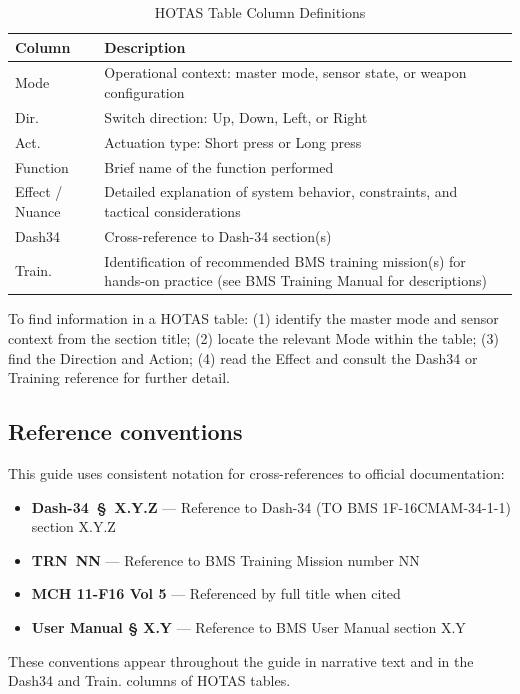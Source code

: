 \documentclass[11pt, a4paper, twoside]{report}
\newcommand{\dashref}[1]{Dash-34~\S~#1}
\newcommand{\trnref}[1]{TRN~#1}
\begin{document}
\begin{table}[H]
	\centering
	\caption{HOTAS Table Column Definitions}
	\label{tab:C1-hotastable-format}
	\small
	\renewcommand{\arraystretch}{1.25}
	\begin{tabular}{L{2.2cm} L{11.5cm}}
		\toprule
		\textbf{Column} & \textbf{Description} \\
		\midrule
		Mode & Operational context: master mode, sensor state, or weapon configuration \\
		Dir. & Switch direction: Up, Down, Left, or Right \\
		Act. & Actuation type: Short press or Long press \\
		Function & Brief name of the function performed \\
		Effect / Nuance & Detailed explanation of system behavior, constraints, and tactical considerations \\
		Dash34 & Cross-reference to Dash-34 section(s) \\
		Train. & Identification of recommended BMS training mission(s) for hands-on practice (see BMS Training Manual for descriptions) \\
		\bottomrule
	\end{tabular}
\end{table}

To find information in a HOTAS table: (1) identify the master mode and sensor context from the section title; (2) locate the relevant Mode within the table; (3) find the Direction and Action; (4) read the Effect and consult the Dash34 or Training reference for further detail.

\subsection{Reference conventions}
\label{sec:C1-S3-S3}

This guide uses consistent notation for cross-references to official documentation:
\begin{itemize}
	\item \textbf{\dashref{X.Y.Z}} --- Reference to Dash-34 (TO BMS 1F-16CMAM-34-1-1) section X.Y.Z
	\item \textbf{\trnref{NN}} --- Reference to BMS Training Mission number NN
	\item \textbf{MCH 11-F16 Vol 5} --- Referenced by full title when cited
	\item \textbf{User Manual § X.Y} --- Reference to BMS User Manual section X.Y
\end{itemize}
These conventions appear throughout the guide in narrative text and in the Dash34 and Train. columns of HOTAS tables.
\end{document}
